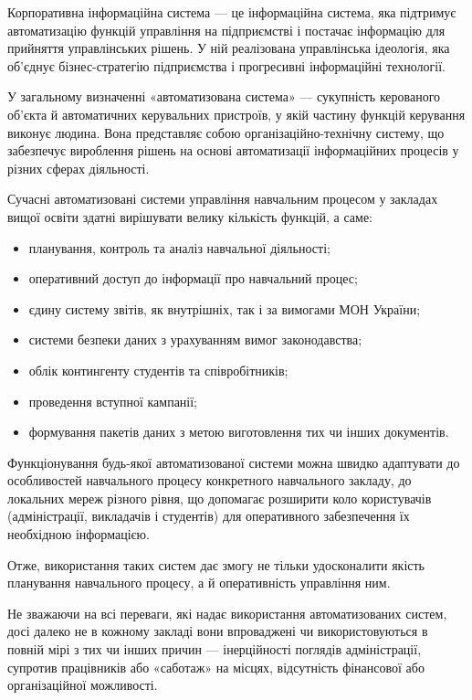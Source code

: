 \label{subsubs:KIS}

Корпоративна інформаційна система — це інформаційна система, яка підтримує автоматизацію функцій управління на підприємстві і постачає інформацію для прийняття управлінських рішень. У ній реалізована управлінська ідеологія, яка об'єднує бізнес-стратегію підприємства і прогресивні інформаційні технології.

У загальному визначенні «автоматизована система» — сукупність керованого об’єкта й автоматичних керувальних пристроїв, у якій частину функцій керування виконує людина. Вона представляє собою організаційно-технічну систему, що забезпечує вироблення рішень на основі автоматизації інформаційних процесів у різних сферах діяльності. 

Сучасні автоматизовані системи управління навчальним процесом у  закладах вищої освіти здатні вирішувати велику кількість функцій, а саме:
\begin{itemize}
	\item планування, контроль та аналіз навчальної діяльності;
	\item оперативний доступ до інформації про навчальний процес;
	\item єдину систему звітів, як внутрішніх, так і за вимогами МОН України;
	\item системи безпеки даних з урахуванням вимог законодавства;
	\item облік контингенту студентів та співробітників;
	\item проведення вступної кампанії;
	\item формування пакетів даних з метою виготовлення тих чи інших документів.
\end{itemize}

Функціонування будь-якої автоматизованої системи можна швидко адаптувати до особливостей навчального процесу конкретного навчального закладу, до локальних мереж різного рівня, що допомагає розширити коло користувачів (адміністрації, викладачів і студентів) для оперативного забезпечення їх необхідною інформацією. 

Отже, використання таких систем дає змогу не тільки удосконалити якість планування навчального процесу, а й оперативність управління ним.

Не зважаючи на всі переваги, які надає використання автоматизованих систем, досі далеко не в кожному закладі вони впроваджені чи використовуються в повній мірі з тих чи інших причин — інерційності поглядів адміністрації, супротив працівників або «саботаж» на місцях, відсутність фінансової або організаційної можливості.
